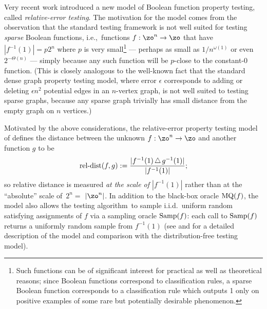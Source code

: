 \documentclass[11pt]{article}
\theoremstyle{definition}
\begin{document}
\medskip

Very recent work \cite{CDHLNSY2024} introduced a new model of Boolean function property testing, called \emph{relative-error testing}.  The motivation for the model comes from the observation that the standard testing framework is not well suited for testing \emph{sparse} Boolean functions, i.e.,~functions $f: \zo^n \to \zo$ that have $|f^{-1}(1)| = p 2^n$ where $p$ is very small\footnote{Such functions can be of significant interest for practical as well as theoretical reasons; since Boolean functions correspond to classification rules, a sparse Boolean function corresponds to a classification rule which outputs 1 only on positive examples of some rare but potentially desirable phenomenon.} --- perhaps as small as $1/n^{\omega(1)}$ or even $2^{-\Theta(n)}$ ---
 simply because any such function will be $p$-close to the constant-$0$ function.
(This is closely analogous to the well-known fact that the standard dense graph property testing model, where error $\epsilon$ corresponds to adding or deleting $\epsilon n^2$ potential edges in an $n$-vertex graph, is not well suited to testing
sparse graphs, because any sparse graph trivially has small distance from the empty graph on $n$ vertices.)

Motivated by the above considerations, the relative-error property testing model of \cite{CDHLNSY2024} defines the distance between the unknown $f: \zo^n \to \zo$ and another function $g$ to be
\[
\mathrm{rel}\text{-}\mathrm{dist}(f,g) := {\frac {|f^{-1}(1) \hspace{0.05cm} \triangle \hspace{0.05cm} g^{-1}(1)|}{|f^{-1}(1)|}};
\]
so relative distance is measured \emph{at the scale of $|f^{-1}(1)|$} rather than at the ``absolute'' scale of~$2^n =$ $ |\zo^n|$. In addition to the black-box oracle $\mathrm{MQ}(f)$, the model also allows the testing algorithm~to sample i.i.d.~uniform random satisfying assignments of $f$ via a sampling oracle $\mathrm{Samp}(f)$: each call to 
  $\mathrm{Samp}(f)$ returns a uniformly random sample from $f^{-1}(1)$ (see  and  for a detailed description of the model and comparison with the distribution-free testing model).
\end{document}
